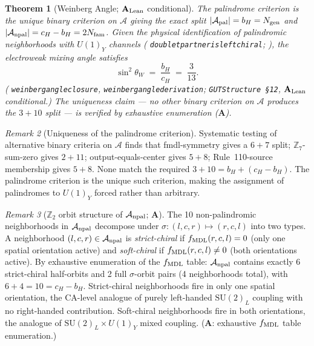 \documentclass[11pt]{article}
\newtheorem{theorem}{Theorem}[section]
\theoremstyle{remark}
\newtheorem{remark}[theorem]{Remark}
\newcommand{\Ngen}{N_{\rm gen}}
\newcommand{\Nfam}{N_{\rm fam}}
\newcommand{\bH}{b_H}
\newcommand{\cH}{c_H}
\newcommand{\lean}[1]{%
  \penalty-100
  \begingroup\def\_{\textunderscore\allowbreak}\texttt{#1}\endgroup}
\newcommand{\sinwsq}{\sin^2\!\theta_W}
\newcommand{\CatA}{\textbf{A}}
\newcommand{\CatAL}{\ensuremath{\textbf{A}_{\rm Lean}}}
\begin{document}
\begin{theorem}[Weinberg Angle; $\CatAL$ conditional]
\label{thm:weinberg}
The palindrome criterion is the \emph{unique} binary criterion on $\mathcal{A}$
giving the exact split $|\mathcal{A}_{\rm pal}| = \bH = \Ngen$ and
$|\mathcal{A}_{\rm npal}| = \cH - \bH = 2\Nfam$.
Given the physical identification of palindromic neighborhoods with $U(1)_Y$ channels
(\lean{doublet\_partner\_is\_left\_chiral}; \cite{Spivack2026_UGPDynamics}), the
electroweak mixing angle satisfies
\begin{equation}
  \sinwsq \;=\; \frac{\bH}{\cH} \;=\; \frac{3}{13}.
  \label{eq:weinberg_theorem}
\end{equation}
(\lean{weinberg\_angle\_closure}, \lean{weinberg\_angle\_derivation};
\texttt{GUTStructure~\S12}, $\CatAL$ conditional.)
The uniqueness claim --- no other binary criterion on $\mathcal{A}$ produces the $3 + 10$
split --- is verified by exhaustive enumeration ($\CatA$).
\end{theorem}

\begin{remark}[Uniqueness of the palindrome criterion]
Systematic testing of alternative binary criteria on $\mathcal{A}$ finds that
fmdl-symmetry gives a $6 + 7$ split; $\mathbb{Z}_7$-sum-zero gives $2 + 11$;
output-equals-center gives $5 + 8$; Rule~110-source membership gives $5 + 8$.
None match the required $3 + 10 = \bH + (\cH - \bH)$.  The palindrome criterion is
the unique such criterion, making the assignment of palindromes to $U(1)_Y$ forced rather
than arbitrary.
\end{remark}

\begin{remark}[$\mathbb{Z}_2$ orbit structure of $\mathcal{A}_{\rm npal}$; $\CatA$]
\label{rem:z2orbit}
The 10 non-palindromic neighborhoods in $\mathcal{A}_{\rm npal}$ decompose under
$\sigma: (l,c,r) \mapsto (r,c,l)$ into two types.
A neighborhood $(l,c,r) \in \mathcal{A}_{\rm npal}$ is \emph{strict-chiral} if
$f_{\rm MDL}(r,c,l) = 0$ (only one spatial orientation active) and
\emph{soft-chiral} if $f_{\rm MDL}(r,c,l) \neq 0$ (both orientations active).
By exhaustive enumeration of the $f_{\rm MDL}$ table: $\mathcal{A}_{\rm npal}$
contains exactly 6 strict-chiral half-orbits and 2 full $\sigma$-orbit pairs
(4 neighborhoods total), with $6 + 4 = 10 = \cH - \bH$.
Strict-chiral neighborhoods fire in only one spatial orientation, the CA-level
analogue of purely left-handed $\mathrm{SU}(2)_L$ coupling with no right-handed
contribution.  Soft-chiral neighborhoods fire in both orientations, the analogue of
$\mathrm{SU}(2)_L \times U(1)_Y$ mixed coupling.
($\CatA$: exhaustive $f_{\rm MDL}$ table enumeration.)
\end{remark}
\end{document}
